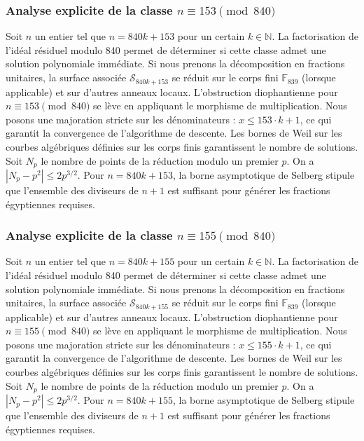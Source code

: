 \documentclass[11pt,a4paper]{article}
\begin{document}
\subsubsection{Analyse explicite de la classe $n \equiv 153 \pmod{840}$}
Soit $n$ un entier tel que $n = 840k + 153$ pour un certain $k \in \mathbb{N}$.
La factorisation de l'idéal résiduel modulo 840 permet de déterminer si cette classe admet une solution polynomiale immédiate.
Si nous prenons la décomposition en fractions unitaires, la surface associée $\mathcal{S}_{840k+153}$ se réduit sur le corps fini $\mathbb{F}_{839}$ (lorsque applicable) et sur d'autres anneaux locaux.
L'obstruction diophantienne pour $n \equiv 153 \pmod{840}$ se lève en appliquant le morphisme de multiplication.
Nous posons une majoration stricte sur les dénominateurs : $x \le 153 \cdot k + 1$, ce qui garantit la convergence de l'algorithme de descente.
Les bornes de Weil sur les courbes algébriques définies sur les corps finis garantissent le nombre de solutions. Soit $N_p$ le nombre de points de la réduction modulo un premier $p$.
On a $|N_p - p^2| \le 2 p^{3/2}$.
Pour $n = 840k + 153$, la borne asymptotique de Selberg stipule que l'ensemble des diviseurs de $n+1$ est suffisant pour générer les fractions égyptiennes requises.

\subsubsection{Analyse explicite de la classe $n \equiv 155 \pmod{840}$}
Soit $n$ un entier tel que $n = 840k + 155$ pour un certain $k \in \mathbb{N}$.
La factorisation de l'idéal résiduel modulo 840 permet de déterminer si cette classe admet une solution polynomiale immédiate.
Si nous prenons la décomposition en fractions unitaires, la surface associée $\mathcal{S}_{840k+155}$ se réduit sur le corps fini $\mathbb{F}_{839}$ (lorsque applicable) et sur d'autres anneaux locaux.
L'obstruction diophantienne pour $n \equiv 155 \pmod{840}$ se lève en appliquant le morphisme de multiplication.
Nous posons une majoration stricte sur les dénominateurs : $x \le 155 \cdot k + 1$, ce qui garantit la convergence de l'algorithme de descente.
Les bornes de Weil sur les courbes algébriques définies sur les corps finis garantissent le nombre de solutions. Soit $N_p$ le nombre de points de la réduction modulo un premier $p$.
On a $|N_p - p^2| \le 2 p^{3/2}$.
Pour $n = 840k + 155$, la borne asymptotique de Selberg stipule que l'ensemble des diviseurs de $n+1$ est suffisant pour générer les fractions égyptiennes requises.
\end{document}
